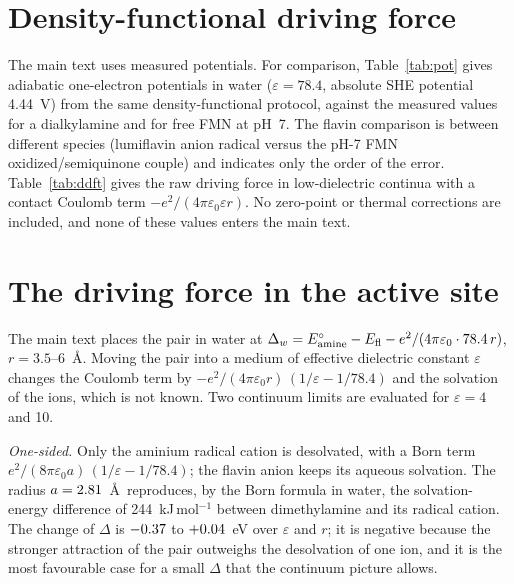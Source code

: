 \documentclass[11pt]{article}
\begin{document}
\begin{table}[h]
\caption{Coupling scan. ``valid'': non-clashing geometries of those computed.}
\label{tab:t}
\centering

\end{table}

\section{Density-functional driving force}
The main text uses measured potentials. For comparison, Table~\ref{tab:pot}
gives adiabatic one-electron potentials in water ($\varepsilon = 78.4$, absolute
SHE potential 4.44~V\cite{Jonsson1996}) from the same density-functional
protocol, against the measured values for a dialkylamine\cite{Jonsson1996} and
for free FMN at pH~7.\cite{Mayhew1999} The flavin comparison is between
different species (lumiflavin anion radical versus the pH-7 FMN
oxidized/semiquinone couple) and indicates only the order of the error.
Table~\ref{tab:ddft} gives the raw driving force in low-dielectric continua with
a contact Coulomb term $-e^2/(4\pi\varepsilon_0\varepsilon r)$. No zero-point or
thermal corrections are included, and none of these values enters the main
text.

\begin{table}[h]
\caption{One-electron potentials in water.}
\label{tab:pot}
\centering

\end{table}

\begin{table}[h]
\caption{Raw DFT driving force of the contact pair.}
\label{tab:ddft}
\centering

\end{table}

\section{The driving force in the active site}
The main text places the pair in water at
$\Delta_w = E^\circ_{\rm amine} - E_{\rm fl} - e^2/(4\pi\varepsilon_0\cdot78.4\,r)$,
$r = 3.5$--6~\AA. Moving the pair into a medium of effective dielectric constant
$\varepsilon$ changes the Coulomb term by
$-e^2/(4\pi\varepsilon_0r)\,(1/\varepsilon-1/78.4)$ and the solvation of the ions,
which is not known. Two continuum limits are evaluated for $\varepsilon = 4$ and 10.

\emph{One-sided.} Only the aminium radical cation is desolvated, with a Born
term $e^2/(8\pi\varepsilon_0a)\,(1/\varepsilon-1/78.4)$; the flavin anion keeps its
aqueous solvation. The radius $a = 2.81$~\AA\ reproduces, by the Born
formula in water, the solvation-energy difference of 244~kJ\,mol$^{-1}$ between
dimethylamine and its radical cation.\cite{Jonsson1996} The change of $\Delta$
is $-0.37$ to $+0.04$~eV over $\varepsilon$ and $r$; it is negative
because the stronger attraction of the pair outweighs the desolvation of one ion,
and it is the most favourable case for a small $\Delta$ that the continuum
picture allows.
\end{document}
